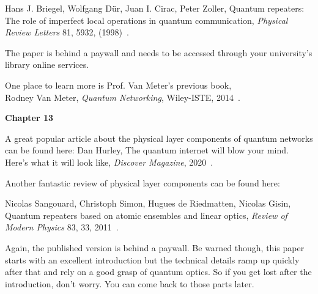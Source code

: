 Hans J. Briegel, Wolfgang Dür, Juan I. Cirac, Peter Zoller, Quantum repeaters: The role of imperfect local operations in quantum communication, \emph{Physical Review Letters} 81, 5932, (1998)~\cite{briegel98:_quant_repeater}.

The paper is behind a paywall and needs to be accessed through your university’s library online services.

One place to learn more is Prof. Van Meter's previous book,\\
Rodney Van Meter, \emph{Quantum Networking}, Wiley-ISTE, 2014~\cite{van-meter14:_quantum_networking}.



{\bf Chapter 13}

A great popular article about the physical layer components of quantum networks can be found here:
Dan Hurley, The quantum internet will blow your mind. Here’s what it will look like, \emph{Discover Magazine}, 2020~\cite{hurley2020quantum}.

Another fantastic review of physical layer components can be found here:

Nicolas Sangouard, Christoph Simon, Hugues de Riedmatten, Nicolas Gisin, Quantum repeaters based on atomic ensembles and linear optics, \emph{Review of Modern Physics} 83, 33, 2011~\cite{sangouard2011quantum}.

Again, the published version is behind a paywall. Be warned though, this paper starts with an excellent introduction but the technical details ramp up quickly after that and rely on a good grasp of quantum optics. So if you get lost after the introduction, don’t worry. You can come back to those parts later.
